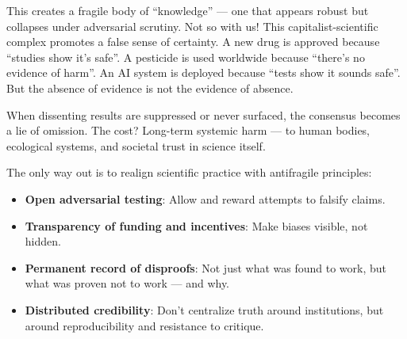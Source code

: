 This creates a fragile body of “knowledge” — one that appears robust but collapses under adversarial scrutiny. Not so with us!  This capitalist-scientific complex promotes a false sense of certainty. A new drug is approved because “studies show it’s safe”. A pesticide is used worldwide because “there’s no evidence of harm”. An AI system is deployed because “tests show it sounds safe”. But the absence of evidence is not the evidence of absence. 

When dissenting results are suppressed or never surfaced, the consensus becomes a lie of omission. The cost? Long-term systemic harm — to human bodies, ecological systems, and societal trust in science itself.

The only way out is to realign scientific practice with antifragile principles:
\begin{itemize}
	\item \textbf{Open adversarial testing}: Allow and reward attempts to falsify claims.
	\item \textbf{Transparency of funding and incentives}: Make biases visible, not hidden.
	\item \textbf{Permanent record of disproofs}: Not just what was found to work, but what was proven not to work — and why.
	\item \textbf{Distributed credibility}: Don’t centralize truth around institutions, but around reproducibility and resistance to critique.
\end{itemize}